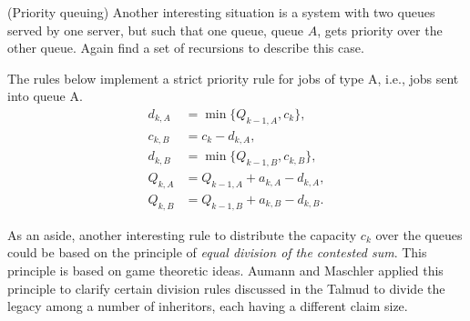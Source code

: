   \begin{exercise} (Priority queuing) Another interesting situation is
    a system with two queues served by one server, but such that one
    queue, queue $A$, gets priority over the other
    queue. Again find a set of recursions to describe this case.
    \begin{solution}
      The rules below implement a strict priority rule for jobs of type
      A, i.e., jobs sent into queue A.
\begin{equation*}
  \begin{split}
    d_{k,A} &= \min\{Q_{k-1, A}, c_k\}, \\
    c_{k,B} &= c_k - d_{k,A}, \\
    d_{k,B} &= \min\{Q_{k-1, B}, c_{k,B}\}, \\
    Q_{k,A} &= Q_{k-1, A} + a_{k,A} - d_{k,A}, \\
    Q_{k,B} &= Q_{k-1, B} + a_{k,B} - d_{k,B}.
  \end{split}
\end{equation*}

As an aside, another interesting rule to distribute the capacity $c_k$
over the queues could be based on the principle of \textit{ equal
  division of the contested sum}. This principle is based on game
theoretic ideas. Aumann and Maschler applied this principle to clarify
certain division rules discussed in the Talmud to divide the legacy
among a number of inheritors, each having a different claim size.
    \end{solution}
\end{exercise}



